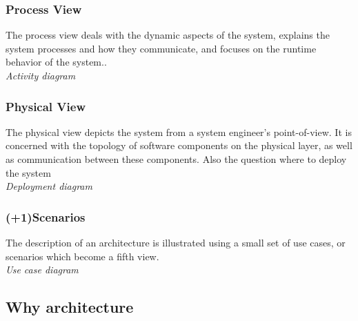 \hypertarget{process-view}{%
\subsubsection{Process View}\label{process-view}}

The process view deals with the dynamic aspects of the system, explains
the system processes and how they communicate, and focuses on the
runtime behavior of the system.. \\
\textit{Activity diagram}

\hypertarget{physical-view}{%
\subsubsection{Physical View}\label{physical-view}}

The physical view depicts the system from a system engineer's
point-of-view. It is concerned with the topology of software components
on the physical layer, as well as communication between these
components. Also the question where to deploy the system\\
\textit{Deployment diagram}

\hypertarget{scenarios}{%
\subsubsection{(+1)Scenarios}\label{scenarios}}

The description of an architecture is illustrated using a small set of
use cases, or scenarios which become a fifth view.\\
\textit{Use case diagram}

\hypertarget{why-architecture}{%
\subsection{Why architecture}\label{why-architecture}}

